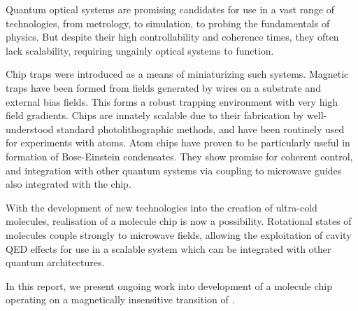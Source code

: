 Quantum optical systems are promising candidates for use in a vast range of
technologies, from metrology, to simulation, to probing the fundamentals of
physics. But despite their high controllability and coherence times, they often
lack scalability, requiring ungainly optical systems to function.

Chip traps were introduced as a means of miniaturizing such systems. Magnetic
traps have been formed from fields generated by wires on a substrate and
external bias fields. This forms a robust trapping environment with very high
field gradients. Chips are innately scalable due to their fabrication by
well-understood standard photolithographic methods, and have been routinely used
for experiments with atoms. Atom chips have proven to be particularly useful in
formation of Bose-Einstein condensates. They show promise for coherent control,
and integration with other quantum systems via coupling to microwave guides also
integrated with the chip.

With the development of new technologies into the creation of ultra-cold
molecules, realisation of a molecule chip is now a possibility. Rotational
states of molecules couple strongly to microwave fields, allowing the
exploitation of cavity QED effects for use in a scalable system which can be
integrated with other quantum architectures.

In this report, we present ongoing work into development of a molecule chip
operating on a magnetically insensitive transition of \CaF{}.
